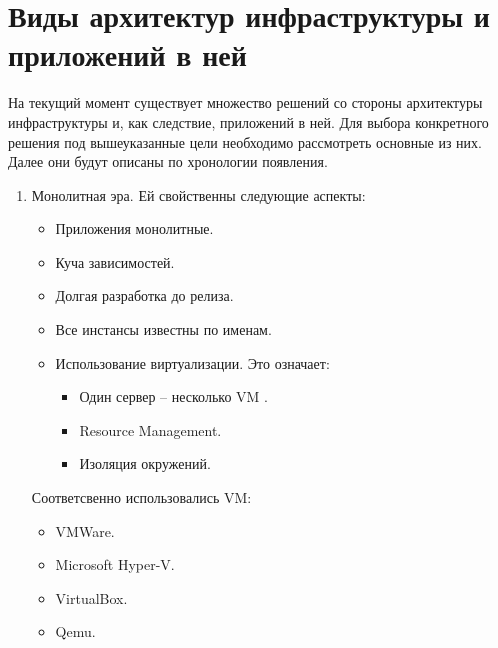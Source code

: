 \section{Виды архитектур инфраструктуры и приложений в ней}
\label{sec:history}

На текущий момент существует множество решений со стороны архитектуры инфраструктуры и, как следствие, приложений в ней. Для выбора конкретного решения под вышеуказанные цели необходимо рассмотреть основные из них. Далее они будут описаны по хронологии появления.

\begin{enumerate}
    \item Монолитная эра. Ей свойственны следующие аспекты:
        \begin{itemize}
            \item Приложения монолитные.
            \item Куча зависимостей.
            \item Долгая разработка до релиза.
            \item Все инстансы известны по именам.
            \item Использование виртуализации. Это означает:
                \begin{itemize}
                    \item Один сервер -- несколько VM \cite{wiki:vm}.
                    \item Resource Management.
                    \item Изоляция окружений.
                \end{itemize}
        \end{itemize}

        Соответсвенно использовались VM:
        \begin{itemize}
            \item VMWare.
            \item Microsoft Hyper-V.
            \item VirtualBox.
            \item Qemu.
        \end{itemize}


\end{enumerate}

